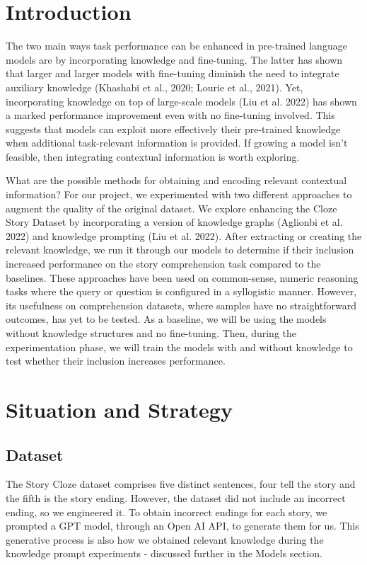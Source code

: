 \documentclass{article}
\begin{document}
\begin{multicols}{2}

\section{Introduction}
The two main ways task performance can be enhanced in pre-trained language models are by incorporating knowledge and fine-tuning. The latter has shown that larger and larger models with fine-tuning diminish the need to integrate auxiliary knowledge (Khashabi et al., 2020; Lourie et al., 2021). Yet, incorporating knowledge on top of large-scale models (Liu et al. 2022) has shown a marked performance improvement even with no fine-tuning involved. This suggests that models can exploit more effectively their pre-trained knowledge when additional task-relevant information is provided. If growing a model isn’t feasible, then integrating contextual information is worth exploring.

What are the possible methods for obtaining and encoding relevant contextual information? For our project, we experimented with two different approaches to augment the quality of the original dataset. We explore enhancing the Cloze Story Dataset by incorporating a version of knowledge graphs (Aglionbi et al. 2022) and knowledge prompting (Liu et al. 2022). After extracting or creating the relevant knowledge, we run it through our models to determine if their inclusion increased performance on the story comprehension task compared to the baselines. These approaches have been used on common-sense, numeric reasoning tasks where the query or question is configured in a syllogistic manner. However, its usefulness on comprehension datasets, where samples have no straightforward outcomes, has yet to be tested. As a baseline, we will be using the models without knowledge structures and no fine-tuning. Then, during the experimentation phase, we will train the models with and without knowledge to test whether their inclusion increases performance.

\section{Situation and Strategy}
\subsection{Dataset}
The Story Cloze dataset comprises five distinct sentences, four tell the story and the fifth is the story ending. However, the dataset did not include an incorrect ending, so we engineered it. To obtain incorrect endings for each story, we prompted a GPT model, through an Open AI API, to generate them for us. This generative process is also how we obtained relevant knowledge during the knowledge prompt experiments - discussed further in the Models section. 


\end{multicols}
\end{document}
